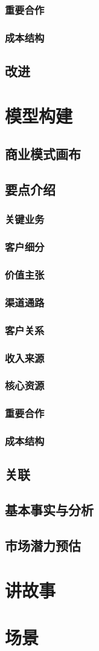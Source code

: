 \documentclass[a4paper,12pt]{article}
\begin{document}
\subsubsection{重要合作}
\subsubsection{成本结构}
\subsection{改进}
\section{模型构建}
\subsection{商业模式画布}
\subsection{要点介绍}
\subsubsection{关键业务}
\subsubsection{客户细分}
\subsubsection{价值主张}
\subsubsection{渠道通路}
\subsubsection{客户关系}
\subsubsection{收入来源}
\subsubsection{核心资源}
\subsubsection{重要合作}
\subsubsection{成本结构}
\subsection{关联}
\subsection{基本事实与分析}
\subsection{市场潜力预估}
\section{讲故事}
\section{场景}
\end{document}
